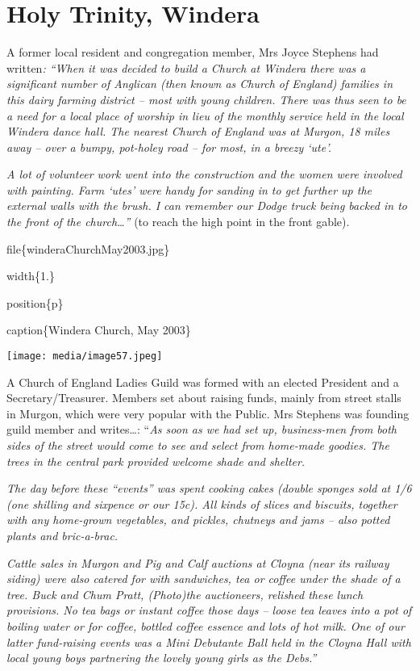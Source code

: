 \hypertarget{holy-trinity-windera}{%
\section{Holy Trinity, Windera}\label{holy-trinity-windera}}

A former local resident and congregation member, Mrs Joyce Stephens had written\emph{: ``When it was decided to build a Church at Windera there was a significant number of Anglican (then known as Church of England) families in this dairy farming district -- most with young children. There was thus seen to be a need for a local place of worship in lieu of the monthly service held in the local Windera dance hall. The nearest Church of England was at Murgon, 18 miles away -- over a bumpy, pot-holey road -- for most, in a breezy `ute'.}

\emph{A lot of volunteer work went into the construction and the women were involved with painting. Farm `utes' were handy for sanding in to get further up the external walls with the brush. I can remember our Dodge truck being backed in to the front of the church\ldots''} (to reach the high point in the front gable).

file\{winderaChurchMay2003.jpg\}

width\{1.\}

position\{p\}

caption\{Windera Church, May 2003\}

\texttt{[image: media/image57.jpeg]}

A Church of England Ladies Guild was formed with an elected President and a Secretary/Treasurer. Members set about raising funds, mainly from street stalls in Murgon, which were very popular with the Public. Mrs Stephens was founding guild member and writes\ldots: ``\emph{As soon as we had set up, business-men from both sides of the street would come to see and select from home-made goodies. The trees in the central park provided welcome shade and shelter.}

\emph{The day before these ``events'' was spent cooking cakes (double sponges sold at 1/6 (one shilling and sixpence or our 15c). All kinds of slices and biscuits, together with any home-grown vegetables, and pickles, chutneys and jams -- also potted plants and bric-a-brac.}

\emph{Cattle sales in Murgon and Pig and Calf auctions at Cloyna (near its railway siding) were also catered for with sandwiches, tea or coffee under the shade of a tree. Buck and Chum Pratt, (Photo)the auctioneers, relished these lunch provisions. No tea bags or instant coffee those days -- loose tea leaves into a pot of boiling water or for coffee, bottled coffee essence and lots of hot milk. One of our latter fund-raising events was a Mini Debutante Ball held in the Cloyna Hall with local young boys partnering the lovely young girls as the Debs.''}

